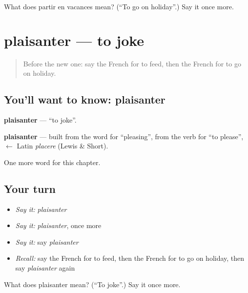 \begin{tcolorbox}[breakable,colback=teal!4,colframe=teal!35!black,title={Before you move on}]
What does partir en vacances mean? (\textquotedblleft{}To go on holiday\textquotedblright{}.) Say it once more.
\end{tcolorbox}
\section[plaisanter]{plaisanter — to joke}

\label{lesson:FR-C242-plaisanter}



\begin{quote}
Before the new one: say the French for to feed, then the French for to go on holiday.
\end{quote}

\subsection*{You'll want to know: plaisanter}
\textbf{plaisanter} — \textquotedblleft{}to joke\textquotedblright{}.

\begin{cousinweb}
\textbf{plaisanter} — built from the word for \textquotedblleft{}pleasing\textquotedblright{}, from the verb for \textquotedblleft{}to please\textquotedblright{}, $\leftarrow$ Latin \emph{placere} (Lewis \& Short).
\end{cousinweb}

\begin{grammarlens}[title={What you've built}]
One more word for this chapter.
\end{grammarlens}

\subsection*{Your turn}
\begin{itemize}
\raggedright
  \item \emph{Say it:} \emph{plaisanter}
  \item \emph{Say it:} \emph{plaisanter}, once more
  \item \emph{Say it:} say \emph{plaisanter}
  \item \emph{Recall:} say the French for to feed, then the French for to go on holiday, then say \emph{plaisanter} again
\end{itemize}

\begin{tcolorbox}[breakable,colback=teal!4,colframe=teal!35!black,title={Before you move on}]
What does plaisanter mean? (\textquotedblleft{}To joke\textquotedblright{}.) Say it once more.
\end{tcolorbox}
